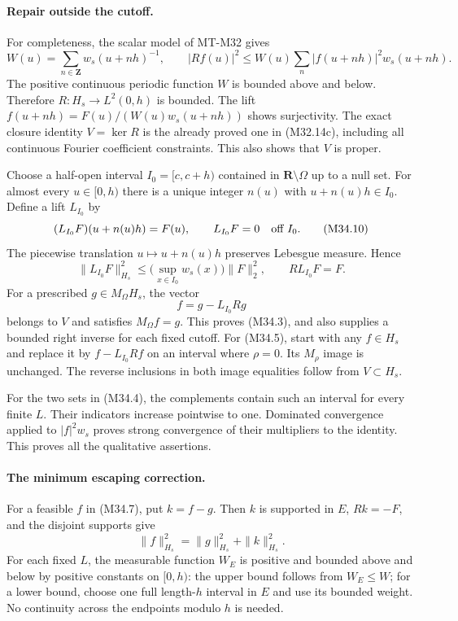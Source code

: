 \paragraph{Repair outside the cutoff.}
For completeness, the scalar model of MT-M32 gives
\[
 W(u)=\sum_{n\in\mathbf Z}w_s(u+nh)^{-1},\qquad
 |Rf(u)|^2\le W(u)\sum_n|f(u+nh)|^2w_s(u+nh).
 \tag{M34.9}
\]
The positive continuous periodic function $W$ is bounded
above and below.  Therefore $R:H_s\to L^2(0,h)$ is
bounded.  The lift $f(u+nh)=F(u)/(W(u)w_s(u+nh))$
shows surjectivity.  The exact closure identity $V=\ker R$
is the already proved one in (M32.14c), including all
continuous Fourier coefficient constraints.  This also
shows that $V$ is proper.

Choose a half-open interval $I_0=[c,c+h)$ contained in
$\mathbf R\setminus\Omega$ up to a null set.  For almost
every $u\in[0,h)$ there is a unique integer $n(u)$ with
$u+n(u)h\in I_0$.  Define a lift $L_{I_0}$ by
\[
 (L_{I_0}F)(u+n(u)h)=F(u),\qquad
 L_{I_0}F=0\quad\hbox{off }I_0.
 \tag{M34.10}
\]
The piecewise translation $u\mapsto u+n(u)h$ preserves
Lebesgue measure.  Hence
\[
 \|L_{I_0}F\|_{H_s}^2
       \le\bigl(\sup_{x\in I_0}w_s(x)\bigr)\|F\|_2^2,
 \qquad R L_{I_0}F=F.
 \tag{M34.11}
\]
For a prescribed $g\in M_\Omega H_s$, the vector
\[
                        f=g-L_{I_0}Rg
 \tag{M34.12}
\]
belongs to $V$ and satisfies $M_\Omega f=g$.  This proves
(M34.3), and also supplies a bounded right inverse for each
fixed cutoff.  For (M34.5), start with any $f\in H_s$ and
replace it by $f-L_{I_0}Rf$ on an interval where $\rho=0$.
Its $M_\rho$ image is unchanged.  The reverse inclusions
in both image equalities follow from $V\subset H_s$.

For the two sets in (M34.4), the complements contain such
an interval for every finite $L$.  Their indicators increase
pointwise to one.  Dominated convergence applied to
$|f|^2w_s$ proves strong convergence of their multipliers
to the identity.  This proves all the qualitative assertions.

\paragraph{The minimum escaping correction.}
For a feasible $f$ in (M34.7), put $k=f-g$.  Then $k$ is
supported in $E$, $Rk=-F$, and the disjoint supports give
\[
                       \|f\|_{H_s}^2=\|g\|_{H_s}^2+
                                                    \|k\|_{H_s}^2.
 \tag{M34.13}
\]
For each fixed $L$, the measurable function $W_E$ is
positive and bounded above and below by positive constants
on $[0,h)$: the upper bound follows from $W_E\le W$;
for a lower bound, choose one full length-$h$ interval
in $E$ and use its bounded weight.  No continuity across
the endpoints modulo $h$ is needed.

